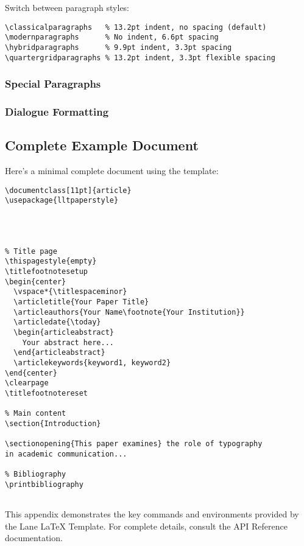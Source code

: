 Switch between paragraph styles:

\begin{verbatim}
\classicalparagraphs   % 13.2pt indent, no spacing (default)
\modernparagraphs      % No indent, 6.6pt spacing
\hybridparagraphs      % 9.9pt indent, 3.3pt spacing
\quartergridparagraphs % 13.2pt indent, 3.3pt flexible spacing
\end{verbatim}

\subsubsection{Special Paragraphs}



\subsubsection{Dialogue Formatting}


\subsection{Complete Example Document}

Here's a minimal complete document using the template:

\begin{verbatim}
\documentclass[11pt]{article}
\usepackage{lltpaperstyle}




% Title page
\thispagestyle{empty}
\titlefootnotesetup
\begin{center}
  \vspace*{\titlespaceminor}
  \articletitle{Your Paper Title}
  \articleauthors{Your Name\footnote{Your Institution}}
  \articledate{\today}
  \begin{articleabstract}
    Your abstract here...
  \end{articleabstract}
  \articlekeywords{keyword1, keyword2}
\end{center}
\clearpage
\titlefootnotereset

% Main content
\section{Introduction}

\sectionopening{This paper examines} the role of typography
in academic communication...

% Bibliography
\printbibliography


\end{verbatim}

This appendix demonstrates the key commands and environments provided by the Lane LaTeX Template. For complete details, consult the API Reference documentation.